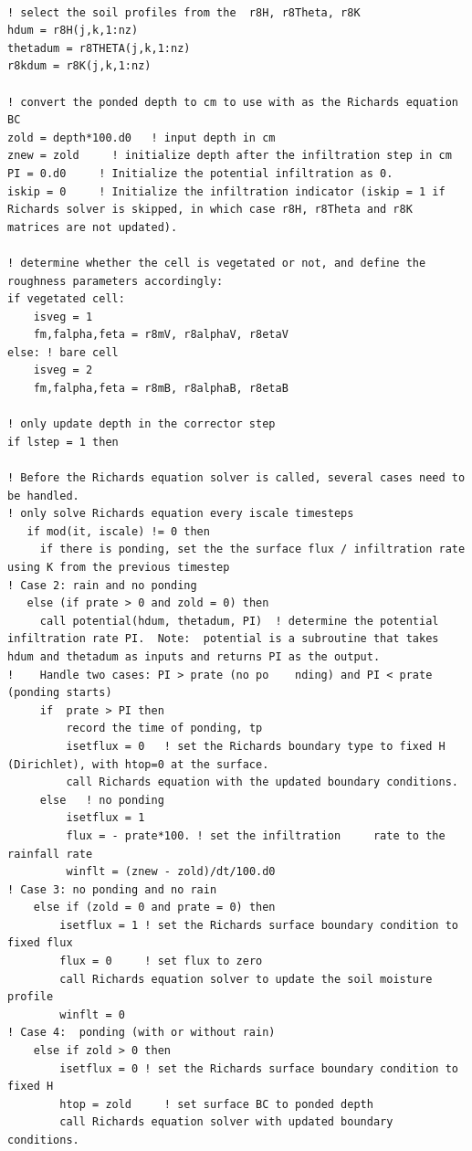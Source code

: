 \documentclass{article}
\begin{document}
\begin{lstlisting}

! select the soil profiles from the  r8H, r8Theta, r8K 
hdum = r8H(j,k,1:nz)
thetadum = r8THETA(j,k,1:nz)   
r8kdum = r8K(j,k,1:nz) 

! convert the ponded depth to cm to use with as the Richards equation BC
zold = depth*100.d0   ! input depth in cm
znew = zold     ! initialize depth after the infiltration step in cm
PI = 0.d0     ! Initialize the potential infiltration as 0.
iskip = 0     ! Initialize the infiltration indicator (iskip = 1 if Richards solver is skipped, in which case r8H, r8Theta and r8K  matrices are not updated). 

! determine whether the cell is vegetated or not, and define the roughness parameters accordingly:
if vegetated cell:
    isveg = 1
    fm,falpha,feta = r8mV, r8alphaV, r8etaV
else: ! bare cell
	isveg = 2
    fm,falpha,feta = r8mB, r8alphaB, r8etaB	

! only update depth in the corrector step
if lstep = 1 then

! Before the Richards equation solver is called, several cases need to be handled. 
! only solve Richards equation every iscale timesteps
   if mod(it, iscale) != 0 then 
     if there is ponding, set the the surface flux / infiltration rate using K from the previous timestep
! Case 2: rain and no ponding
   else (if prate > 0 and zold = 0) then
     call potential(hdum, thetadum, PI)  ! determine the potential infiltration rate PI.  Note:  potential is a subroutine that takes hdum and thetadum as inputs and returns PI as the output.
!    Handle two cases: PI > prate (no po	nding) and PI < prate (ponding starts)
     if  prate > PI then
         record the time of ponding, tp
	     isetflux = 0   ! set the Richards boundary type to fixed H (Dirichlet), with htop=0 at the surface.
	     call Richards equation with the updated boundary conditions.	   
     else 	! no ponding
     	 isetflux = 1
     	 flux = - prate*100. ! set the infiltration 	rate to the rainfall rate       
	     winflt = (znew - zold)/dt/100.d0 
! Case 3: no ponding and no rain
    else if (zold = 0 and prate = 0) then
	    isetflux = 1 ! set the Richards surface boundary condition to fixed flux
		flux = 0     ! set flux to zero
		call Richards equation solver to update the soil moisture profile
		winflt = 0
! Case 4:  ponding (with or without rain)
	else if zold > 0 then
	    isetflux = 0 ! set the Richards surface boundary condition to fixed H
		htop = zold     ! set surface BC to ponded depth
		call Richards equation solver with updated boundary conditions.
	    

\end{lstlisting}
\end{document}
